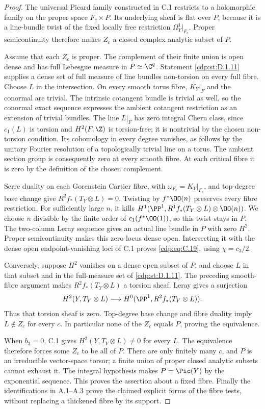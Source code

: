 \begin{proof}
The universal Picard family constructed in C.1 restricts to a holomorphic family on the proper space $F_c\times P$. Its underlying sheaf is flat over $P$, because it is a line-bundle twist of the fixed locally free restriction $\Omega_Y^1|_{F_c}$. Proper semicontinuity therefore makes $Z_c$ a closed complex analytic subset of $P$.

Assume that each $Z_c$ is proper. The complement of their finite union is open dense and has full Lebesgue measure in $P\simeq\C^q$. Statement \ref{cdp:st:D.1.11} supplies a dense set of full measure of line bundles non-torsion on every full fibre. Choose $L$ in the intersection. On every smooth torus fibre, $K_Y|_F$ and the conormal are trivial. The intrinsic cotangent bundle is trivial as well, so the conormal exact sequence expresses the ambient cotangent restriction as an extension of trivial bundles. The line $L|_F$ has zero integral Chern class, since $c_1(L)$ is torsion and $H^2(F,\Z)$ is torsion-free; it is nontrivial by the chosen non-torsion condition. Its cohomology in every degree vanishes, as follows by the unitary Fourier resolution of a topologically trivial line on a torus. The ambient section group is consequently zero at every smooth fibre. At each critical fibre it is zero by the definition of the chosen complement.

Serre duality on each Gorenstein Cartier fibre, with $\omega_{F_c}=K_Y|_{F_c}$, and top-degree base change give $R^2f_*(T_Y\otimes L)=0$. Twisting by $f^*\OO(n)$ preserves every fibre restriction. For sufficiently large $n$, it kills $H^1(\PP^1,R^1f_*(T_Y\otimes L)\otimes\OO(n))$. We choose $n$ divisible by the finite order of $c_1(f^*\OO(1))$, so this twist stays in $P$. The two-column Leray sequence gives an actual line bundle in $P$ with zero $H^2$. Proper semicontinuity makes this zero locus dense open. Intersecting it with the dense open endpoint-vanishing loci of C.1 proves \eqref{cdp:eq:C.19}, using $\chi=c_3/2$.

Conversely, suppose $H^2$ vanishes on a dense open subset of $P$, and choose $L$ in that subset and in the full-measure set of \ref{cdp:st:D.1.11}. The preceding smooth-fibre argument makes $R^2f_*(T_Y\otimes L)$ a torsion sheaf. Leray gives a surjection
\[
 H^2(Y,T_Y\otimes L)\longrightarrow
 H^0(\PP^1,R^2f_*(T_Y\otimes L)).
\]
Thus that torsion sheaf is zero. Top-degree base change and fibre duality imply $L\notin Z_c$ for every $c$. In particular none of the $Z_c$ equals $P$, proving the equivalence.

When $b_3=0$, C.1 gives $H^2(Y,T_Y\otimes L)\ne0$ for every $L$. The equivalence therefore forces some $Z_c$ to be all of $P$. There are only finitely many $c$, and $P$ is an irreducible vector-space torsor; a finite union of proper closed analytic subsets cannot exhaust it. The integral hypothesis makes $P=\Pic(Y)$ by the exponential sequence. This proves the assertion about a fixed fibre. Finally the identifications in A.1--A.3 prove the claimed explicit forms of the fibre tests, without replacing a thickened fibre by its support.
\end{proof}


